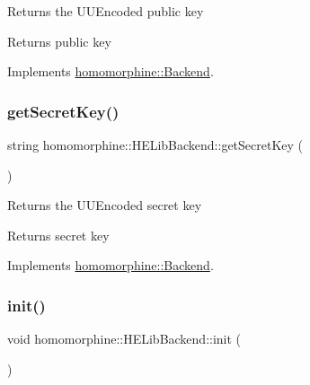 Returns the U\+U\+Encoded public key

\begin{DoxyReturn}{Returns}
public key 
\end{DoxyReturn}


Implements \mbox{\hyperlink{classhomomorphine_1_1_backend_a8bba422ac5b13e77030a884cfd6a0463}{homomorphine\+::\+Backend}}.

\mbox{\label{classhomomorphine_1_1_h_e_lib_backend_a57af39a901a44fef6aad76503739fde4}} 
\subsubsection{\texorpdfstring{getSecretKey()}{getSecretKey()}}
{\footnotesize\ttfamily string homomorphine\+::\+H\+E\+Lib\+Backend\+::get\+Secret\+Key (\begin{DoxyParamCaption}{ }\end{DoxyParamCaption})\hspace{0.3cm}{\ttfamily [virtual]}}

Returns the U\+U\+Encoded secret key

\begin{DoxyReturn}{Returns}
secret key 
\end{DoxyReturn}


Implements \mbox{\hyperlink{classhomomorphine_1_1_backend_a456cb97febfd3819ab400d9583c97153}{homomorphine\+::\+Backend}}.

\mbox{\label{classhomomorphine_1_1_h_e_lib_backend_a6a7e7c8095f2287c41f7d93be91418ec}} 
\subsubsection{\texorpdfstring{init()}{init()}}
{\footnotesize\ttfamily void homomorphine\+::\+H\+E\+Lib\+Backend\+::init (\begin{DoxyParamCaption}{ }\end{DoxyParamCaption})\hspace{0.3cm}{\ttfamily [virtual]}}

